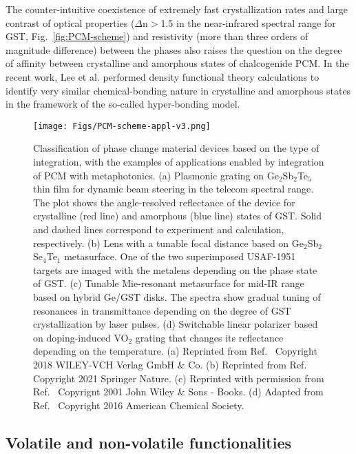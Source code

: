 \documentclass[journal=chreay,manuscript=review]{achemso}
\begin{document}
The counter-intuitive coexistence of extremely fast crystallization rates and large contrast of optical properties ($\Delta$n$>$1.5 in the near-infrared spectral range for GST, Fig.~\ref{fig:PCM-scheme}) and resistivity (more than three orders of magnitude difference\cite{wuttig2007phase}) between the phases  also raises the question on the degree of affinity between crystalline and amorphous states of chalcogenide PCM. In the recent work, Lee et al. \cite{lee2020chemical} performed density functional theory calculations to identify very similar chemical-bonding nature in crystalline and amorphous states in the framework of the so-called hyper-bonding model.


\begin{figure}
    \centering
    \texttt{[image: Figs/PCM-scheme-appl-v3.png]}
    \caption{
    Classification of phase change material devices based on the type of integration, with the examples of applications enabled by integration of PCM with metaphotonics. (a) Plasmonic grating on Ge$_2$Sb$_2$Te$_5$ thin film for dynamic beam steering in the telecom spectral range. The plot shows the angle-resolved reflectance of the device for crystalline (red line) and amorphous (blue line) states of GST. Solid and dashed lines correspond to experiment and calculation, respectively. (b) Lens with a tunable focal distance based on Ge$_2$Sb$_2$Se$_4$Te$_1$ metasurface. One of the two superimposed USAF-1951 targets are imaged with the metalens depending on the phase state of GST. (c) Tunable Mie-resonant metasurface for mid-IR range based on hybrid Ge/GST disks. The spectra show gradual tuning of resonances in transmittance depending on the degree of GST crystallization by laser pulses. (d) Switchable linear polarizer based on doping-induced  VO$_2$ grating that changes its reflectance depending on the temperature. (a) Reprinted from Ref.~ Copyright 2018 WILEY-VCH Verlag GmbH $\&$ Co. (b) Reprinted from Ref.~ Copyright 2021 Springer Nature. (c) Reprinted with permission from Ref.~ Copyrignt 2001 John Wiley $\&$ Sons - Books. (d) Adapted from Ref.~ Copyright 2016 American Chemical Society.}
    \label{fig:PCM-scheme-appl}
\end{figure}

\subsection{Volatile and non-volatile functionalities}
\end{document}
